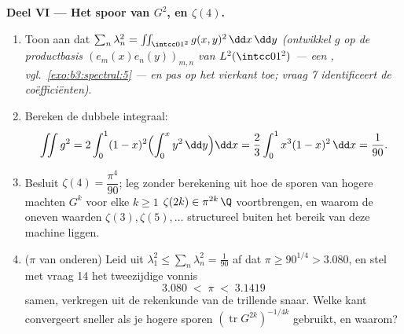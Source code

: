 \begin{problem}
\medskip
\noindent\textbf{Deel VI --- Het spoor van $G^2$, en
$\zeta(4)$.}
\begin{enumerate}[resume]
  \item Toon aan dat $\sum_n\lambda_n^2 =
        \iint_{\intcc01^2}g(x,y)^2\,\dd x\,\dd y$ \emph{(ontwikkel
        $g$ op de productbasis $(e_m(x)e_n(y))_{m,n}$ van
        $L^2(\intcc01^2)$ --- een , vgl.\
        \cref{exo:b3:spectral:5} --- en pas  op het
        vierkant toe; vraag 7 identificeert de coëfficiënten)}.
  \item Bereken de dubbele integraal:
        \[
        \iint g^2 = 2\int_0^1(1-x)^2\Bigl(\int_0^x
        y^2\,\dd y\Bigr)\dd x
        = \frac23\int_0^1x^3(1-x)^2\,\dd x = \frac1{90} .
        \]
  \item Besluit $\zeta(4) = \dfrac{\pi^4}{90}$; leg zonder
        berekening uit hoe de sporen van hogere machten $G^k$
        voor elke $k \geq 1$ $\zeta(2k) \in \pi^{2k}\,\Q$
        voortbrengen, en waarom de oneven waarden $\zeta(3),
        \zeta(5), \dots$ structureel buiten het bereik van deze
        machine liggen.
  \item ($\pi$ van onderen) Leid uit $\lambda_1^2 \leq
        \sum_n\lambda_n^2 = \frac1{90}$ af dat $\pi \geq
        90^{1/4} > 3.080$, en stel met vraag 14 het tweezijdige
        vonnis
        \[
        3.080 \;<\; \pi \;<\; 3.1419
        \]
        samen,  verkregen uit de rekenkunde van de
        trillende snaar. Welke kant convergeert sneller als je
        hogere sporen $(\operatorname{tr}G^{2k})^{-1/4k}$
        gebruikt, en waarom?
\end{enumerate}


\end{problem}
